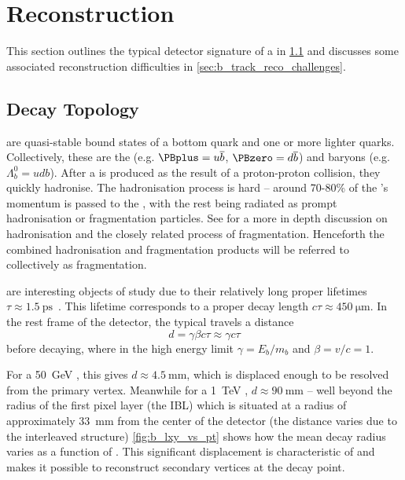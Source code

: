 \section{\texorpdfstring{\bhadron}{b-hadron} Reconstruction}
\label{sec:b_had_reco}

This section outlines the typical detector signature of a \bhadron in \cref{sec:b_decay_topology} and discusses some associated reconstruction difficulties in \cref{sec:b_track_reco_challenges}.


\subsection{Decay Topology}
\label{sec:b_decay_topology}

\bhadrons are quasi-stable bound states of a bottom quark and one or more lighter quarks.
Collectively, these are the \bmesons (e.g. $\PBplus = u \overline{b}$, $\PBzero = d \overline{b}$) and baryons (e.g. $\Lambda_b^0 = udb$).
After a \bquark is produced as the result of a proton-proton collision, they quickly hadronise.
The hadronisation process is hard -- around 70-80\% of the \bquark's momentum is passed to the \bhadron, with the rest being radiated as prompt hadronisation or fragmentation particles.
See  for a more in depth discussion on hadronisation and the closely related process of fragmentation.
Henceforth the combined hadronisation and fragmentation products will be referred to collectively as fragmentation.

\bhadrons are interesting objects of study due to their relatively long proper lifetimes $\tau \approx \SI{1.5}{\pico\second}$~\cite{PhysRevD.98.030001}.
This lifetime corresponds to a proper decay length $c \tau \approx \SI{450}{\micro\meter}$.
In the rest frame of the detector, the typical \bhadron travels a distance 
%
\begin{equation}
  d = \gamma \beta c \tau \approx \gamma c \tau
\end{equation}
%
before decaying, where in the high energy limit $\gamma = E_b/m_b$ and $\beta = v/c = 1$.

For a \SI{50}{\GeV} \bhadron, this gives $d \approx \SI{4.5}{\milli\meter}$, which is displaced enough to be resolved from the primary vertex.
Meanwhile for a \SI{1}{\TeV} \bhadron, $d \approx \SI{90}{\milli\meter}$ -- well beyond the radius of the first pixel layer (the IBL) which is situated at a radius of approximately \SI{33}{\milli\meter} from the center of the detector (the distance varies due to the interleaved structure) 
\cref{fig:b_lxy_vs_pt} shows how the mean decay radius varies as a function of \bhadron \pt.
This significant displacement is characteristic of \bjets and makes it possible to reconstruct secondary vertices at the \bhadron decay point.

